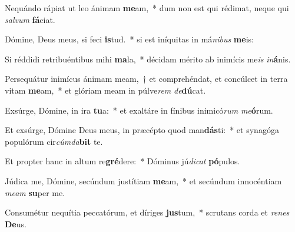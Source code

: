 \item Nequándo rápiat ut leo ánimam \textbf{me}am,~* dum non est qui rédimat, neque qui \textit{sal}\textit{vum} \textbf{fá}ciat.
\item Dómine, Deus meus, si feci \textbf{is}tud.~* si est iníquitas in má\textit{ni}\textit{bus} \textbf{me}is:
\item Si réddidi retribuéntibus mihi \textbf{ma}la,~* décidam mérito ab inimícis me\textit{is} \textit{in}\textbf{á}nis.
\item Persequátur inimícus ánimam meam,~† et comprehéndat, et concúlcet in terra vitam \textbf{me}am,~* et glóriam meam in púlve\textit{rem} \textit{de}\textbf{dú}cat.
\item Exsúrge, Dómine, in ira \textbf{tu}a:~* et exaltáre in fínibus inimicó\textit{rum} \textit{me}\textbf{ó}rum.
\item Et exsúrge, Dómine Deus meus, in præcépto quod man\textbf{dás}ti:~* et synagóga populórum cir\textit{cúm}\textit{da}\textbf{bit} te.
\item Et propter hanc in altum re\textbf{gré}dere:~* Dóminus jú\textit{di}\textit{cat} \textbf{pó}pulos.
\item Júdica me, Dómine, secúndum justítiam \textbf{me}am,~* et secúndum innocéntiam \textit{me}\textit{am} \textbf{su}per me.
\item Consumétur nequítia peccatórum, et díriges \textbf{jus}tum,~* scrutans corda et \textit{re}\textit{nes} \textbf{De}us.
